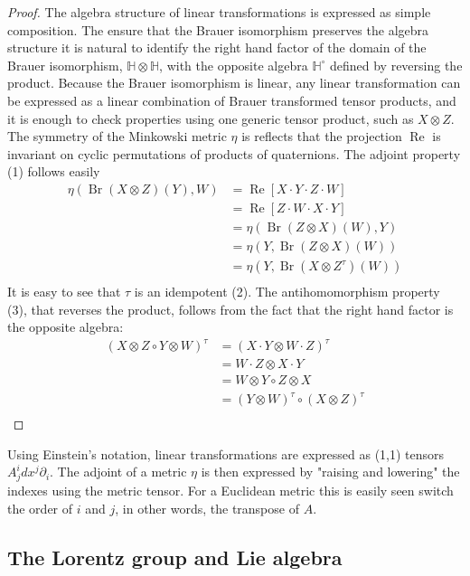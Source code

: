 \documentclass{amsart}
\newcommand{\HH}{\mathbb{H}}
\renewcommand{\Re}{\operatorname{Re}}
\newcommand{\Br}{\operatorname{Br}}
\begin{document}
\begin{proof}
  The algebra structure of linear transformations is expressed as simple composition.
  The ensure that the Brauer isomorphism preserves the algebra structure it is natural to identify the right hand factor of the domain of the Brauer isomorphism, $\HH\otimes\HH$, with the opposite algebra $\HH^\circ$ defined by reversing the product.
  Because the Brauer isomorphism is linear, any linear transformation can be expressed as a linear combination of Brauer transformed tensor products, and it is enough to check properties using one generic tensor product, such as $X\otimes Z$.
  The symmetry of the Minkowski metric $\eta$ is reflects that the projection $\Re$ is invariant on cyclic permutations of products of quaternions.
  The adjoint property (1) follows easily
  \begin{align*}
    \eta(\Br(X\otimes Z)(Y), W) &= \Re[X\cdot Y\cdot Z\cdot W] \\
     &= \Re[Z\cdot W\cdot X\cdot Y] \\
     &= \eta(\Br(Z\otimes X)( W), Y)  \\
     &= \eta(Y, \Br(Z\otimes X) (W)) \\
     &= \eta(Y, \Br(X\otimes Z^\tau) (W)) \\
  \end{align*}
  It is easy to see that $\tau$ is an idempotent (2).
  The antihomomorphism property (3), that reverses the product, follows from the fact that the right hand factor is the opposite algebra:
  \begin{align*}
  (X\otimes Z \circ Y \otimes W)^\tau
   &= (X \cdot Y \otimes W \cdot Z)^\tau \\
   &= W \cdot Z \otimes X \cdot Y \\
   &= W \otimes Y \circ Z \otimes X  \\
    &= (Y \otimes W)^\tau \circ (X \otimes Z)^\tau  \\
\end{align*}
\end{proof}

Using Einstein's notation, linear transformations are expressed as (1,1) tensors $A^i_jdx^j\partial_i$.
The adjoint of a metric $\eta$ is then expressed by "raising and lowering" the indexes using the metric tensor.
For a Euclidean metric this is easily seen switch the order of $i$ and $j$, in other words, the transpose of $A$.

\subsection{The Lorentz group and Lie algebra}
\end{document}
